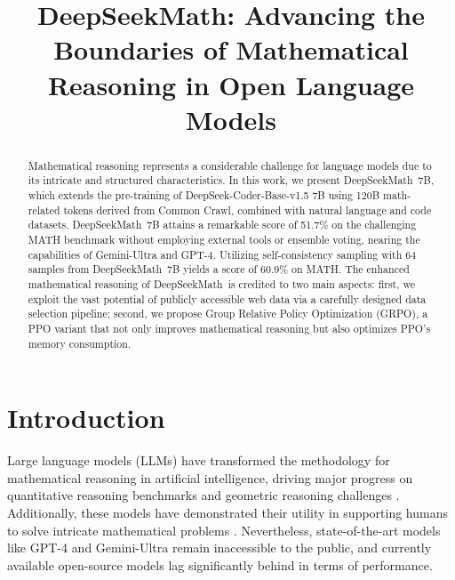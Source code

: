 \title{DeepSeekMath: Advancing the Boundaries of Mathematical Reasoning in Open Language Models}

\begin{abstract}
Mathematical reasoning represents a considerable challenge for language models due to its intricate and structured characteristics. In this work, we present DeepSeekMath~7B, which extends the pre-training of DeepSeek-Coder-Base-v1.5 7B using 120B math-related tokens derived from Common Crawl, combined with natural language and code datasets. DeepSeekMath~7B attains a remarkable score of 51.7\% on the challenging MATH benchmark without employing external tools or ensemble voting, nearing the capabilities of Gemini-Ultra and GPT-4. Utilizing self-consistency sampling with 64 samples from DeepSeekMath~7B yields a score of 60.9\% on MATH. The enhanced mathematical reasoning of DeepSeekMath~is credited to two main aspects: first, we exploit the vast potential of publicly accessible web data via a carefully designed data selection pipeline; second, we propose Group Relative Policy Optimization (GRPO), a PPO variant that not only improves mathematical reasoning but also optimizes PPO’s memory consumption.
\end{abstract}

\section{Introduction}

Large language models (LLMs) have transformed the methodology for mathematical reasoning in artificial intelligence, driving major progress on quantitative reasoning benchmarks \citep{MATH} and geometric reasoning challenges \citep{trinh2024solving}. Additionally, these models have demonstrated their utility in supporting humans to solve intricate mathematical problems \citep{tao}. Nevertheless, state-of-the-art models like GPT-4 \citep{gpt4} and Gemini-Ultra \citep{gemini} remain inaccessible to the public, and currently available open-source models lag significantly behind in terms of performance.

